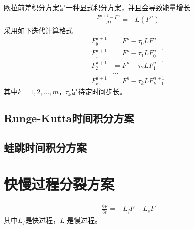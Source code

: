 \documentclass{ctexart}
\begin{document}
欧拉前差积分方案是一种显式积分方案，并且会导致能量增长
\begin{align}
  \frac{F^{n+1} - F^n}{\Delta{t}} = - L \left( F^n \right)
\end{align}
采用如下迭代计算格式
\begin{align*}
  F_0^{n+1} & = F^n - \tau_0 L F^n \\
  F_1^{n+1} & = F^n - \tau_1 L F_0^{n+1} \\
  F_2^{n+1} & = F^n - \tau_2 L F_1^{n+1} \\
  & \dots \\
  F_k^{n+1} & = F^n - \tau_k L F_{k-1}^{n+1}
\end{align*}
其中$k = 1, 2, \dots, m$，$\tau_k$是待定时间步长。

\subsection{Runge-Kutta时间积分方案}

\subsection{蛙跳时间积分方案}

\section{快慢过程分裂方案}

\begin{align}
  \frac{\partial F}{\partial t} = - L_f F - L_s F
\end{align}
其中$L_f$是快过程，$L_s$是慢过程。
\end{document}
